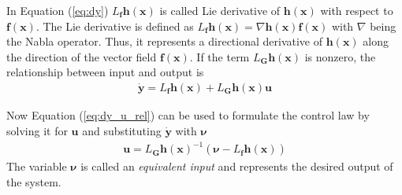 \documentclass[11pt, a4paper, twoside]{report}
\begin{document}
In Equation (\ref{eq:dy}) $L_{\bm{f}} \bm{h}(\bm{x})$ is called Lie derivative of $\bm{h}(\bm{x})$ with respect to $\bm{f}(\bm{x})$. The Lie derivative is defined as $L_{\bm{f}} \bm{h}(\bm{x}) = \nabla\bm{h}(\bm{x}) \bm{f}(\bm{x})$ with $\nabla$ being the Nabla operator. Thus, it represents a directional derivative of $\bm{h}(\bm{x})$ along the direction of the vector field $\bm{f}(\bm{x})$. If the term $L_{\bm{G}} \bm{h}(\bm{x})$ is nonzero, the relationship between input and output is
\begin{equation}
	\begin{split}
		\bm{\dot{y}} = L_{\bm{f}} \bm{h}(\bm{x}) + L_{\bm{G}} \bm{h}(\bm{x}) \bm{u} 
		\label{eq:dy_u_rel}
	\end{split}
\end{equation}

Now Equation (\ref{eq:dy_u_rel}) can be used to formulate the control law by solving it for $\bm{u}$ and substituting $\bm{\dot{y}}$ with $\bm{\nu}$
\begin{equation}
	\begin{split}
		\bm{u} = L_{\bm{G}}\bm{h}(\bm{x})^{-1} (\bm{\nu} - L_{\bm{f}}\bm{h}(\bm{x}))
		\label{eq:u_control_law}
	\end{split}
\end{equation}
The variable $\bm{\nu}$ is called an \textit{equivalent input} and represents the desired output of the system. 
\end{document}
